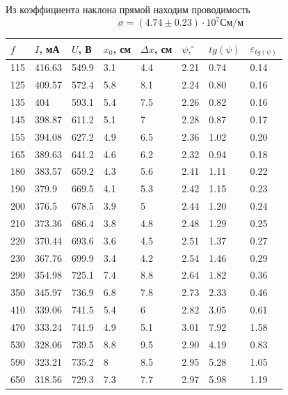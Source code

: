 \documentclass[a4paper, 12pt]{article}
\begin{document}
	\vspace{1cm}
	Из коэффициента наклона прямой находим проводимость
	\begin{equation}
		\sigma = (4.74 \pm 0.23) \cdot 10^7 \text{См/м}
	\end{equation}
	
	\newpage
	\begin{table}[!ht]
		\centering
		\begin{tabular}{|l|l|l|l|l|l|l|l|}
		\hline
			$f$ & $I$, мА & $U$, В & $x_0$, см & $\Delta x$, см & $\psi, ^\circ$ & $tg(\psi)$ & $\varepsilon_{tg(\psi)}$ \\ \hline
			115 & 416.63 & 549.9 & 3.1 & 4.4 & 2.21 & 0.74 & 0.14 \\ \hline
			125 & 409.57 & 572.4 & 5.8 & 8.1 & 2.24 & 0.80 & 0.16 \\ \hline
			135 & 404 & 593.1 & 5.4 & 7.5 & 2.26 & 0.82 & 0.16 \\ \hline
			145 & 398.87 & 611.2 & 5.1 & 7 & 2.28 & 0.87 & 0.17 \\ \hline
			155 & 394.08 & 627.2 & 4.9 & 6.5 & 2.36 & 1.02 & 0.20 \\ \hline
			165 & 389.63 & 641.2 & 4.6 & 6.2 & 2.32 & 0.94 & 0.18 \\ \hline
			180 & 383.57 & 659.2 & 4.3 & 5.6 & 2.41 & 1.11 & 0.22 \\ \hline
			190 & 379.9 & 669.5 & 4.1 & 5.3 & 2.42 & 1.15 & 0.23 \\ \hline
			200 & 376.5 & 678.5 & 3.9 & 5 & 2.44 & 1.20 & 0.24 \\ \hline
			210 & 373.36 & 686.4 & 3.8 & 4.8 & 2.48 & 1.29 & 0.25 \\ \hline
			220 & 370.44 & 693.6 & 3.6 & 4.5 & 2.51 & 1.37 & 0.27 \\ \hline
			230 & 367.76 & 699.9 & 3.4 & 4.2 & 2.54 & 1.46 & 0.29 \\ \hline
			290 & 354.98 & 725.1 & 7.4 & 8.8 & 2.64 & 1.82 & 0.36 \\ \hline
			350 & 345.97 & 736.9 & 6.8 & 7.8 & 2.73 & 2.33 & 0.46 \\ \hline
			410 & 339.06 & 741.5 & 5.4 & 6 & 2.82 & 3.05 & 0.61 \\ \hline
			470 & 333.24 & 741.9 & 4.9 & 5.1 & 3.01 & 7.92 & 1.58 \\ \hline
			530 & 328.06 & 739.5 & 8.8 & 9.5 & 2.90 & 4.19 & 0.83 \\ \hline
			590 & 323.21 & 735.2 & 8 & 8.5 & 2.95 & 5.28 & 1.05 \\ \hline
			650 & 318.56 & 729.3 & 7.3 & 7.7 & 2.97 & 5.98 & 1.19 \\ \hline

\end{tabular}
\end{table}
\end{document}
